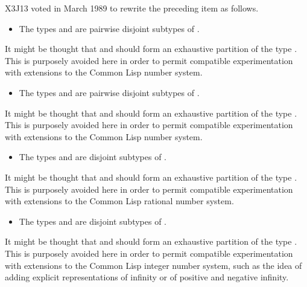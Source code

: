 \begin{newer}
X3J13 voted in March 1989  to rewrite the preceding item
as follows.
\begin{itemize}
\item
The types  and  are pairwise disjoint
subtypes of .
\end{itemize}

\beforenoterule
\begin{rationale}
It might be thought that  and  should
form an exhaustive partition of the type .  This is purposely
avoided here in order to permit compatible experimentation with extensions
to the Common Lisp number system.
\end{rationale}
\afternoterule

\begin{itemize}
\item
The types  and  are pairwise disjoint
subtypes of .
\end{itemize}

\beforenoterule
\begin{rationale}
It might be thought that  and  should
form an exhaustive partition of the type .  This is purposely
avoided here in order to permit compatible experimentation with extensions
to the Common Lisp number system.
\end{rationale}
\afternoterule
\end{newer}

\begin{itemize}
\item
The types  and  are disjoint subtypes of .
\end{itemize}

\beforenoterule
\begin{rationale}
It might be thought that  and  should
form an exhaustive partition of the type .  This is purposely
avoided here in order to permit compatible experimentation with extensions
to the Common Lisp rational number system.
\end{rationale}
\afternoterule

\begin{obsolete}
\begin{itemize}
\item
The types  and  are disjoint subtypes of .
\end{itemize}

\beforenoterule
\begin{rationale}
It might be thought that  and  should
form an exhaustive partition of the type .  This is purposely
avoided here in order to permit compatible experimentation with
extensions to the Common Lisp integer number system, such as the idea of
adding explicit representations of infinity or of positive and negative
infinity.
\end{rationale}
\afternoterule
\end{obsolete}

